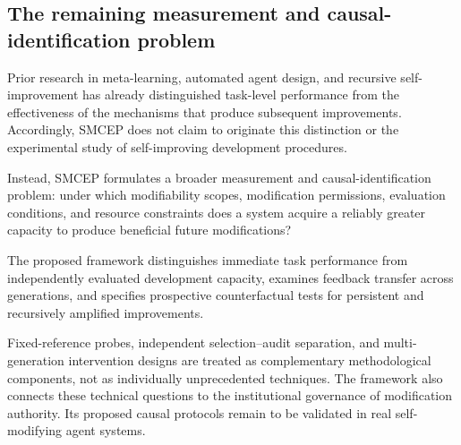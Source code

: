 \documentclass[11pt,a4paper]{article}
\begin{document}
\subsection{The remaining measurement and causal-identification problem}

Prior research in meta-learning, automated agent design, and recursive self-improvement has already distinguished task-level performance from the effectiveness of the mechanisms that produce subsequent improvements. Accordingly, SMCEP does not claim to originate this distinction or the experimental study
of self-improving development procedures.

Instead, SMCEP formulates a broader measurement and causal-identification problem: under which modifiability scopes, modification permissions, evaluation conditions, and resource constraints does a system acquire a reliably greater capacity to produce beneficial future modifications?

The proposed framework distinguishes immediate task performance from independently evaluated development
capacity, examines feedback transfer across generations, and specifies prospective counterfactual tests for persistent and recursively amplified improvements.

Fixed-reference probes, independent selection--audit separation, and multi-generation intervention designs are treated as complementary methodological components, not as individually unprecedented techniques. The framework also connects these technical questions to the institutional governance of modification authority. Its proposed causal protocols remain to be validated
in real self-modifying agent systems.
\end{document}
